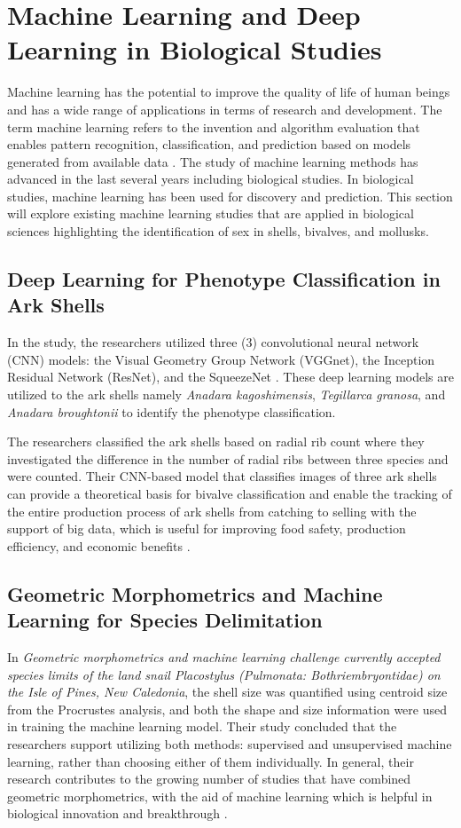 \section{Machine Learning and Deep Learning in Biological Studies}
Machine learning has the potential to improve the quality of life of human beings and has a wide range of applications in terms of research and development. The term machine learning refers to the invention and algorithm evaluation that enables pattern recognition, classification, and prediction based on models generated from available data \cite{tarca2007}. The study of machine learning methods has advanced in the last several years including biological studies. In biological studies, machine learning has been used for discovery and prediction. This section will explore existing machine learning studies that are applied in biological sciences highlighting the identification of sex in shells, bivalves, and mollusks.

\subsection{Deep Learning for Phenotype Classification in Ark Shells}
In the study, the researchers utilized three (3) convolutional neural network (CNN) models: the Visual Geometry Group Network (VGGnet), the Inception Residual Network (ResNet), and the SqueezeNet \cite{kim2024}. These deep learning models are utilized to the ark shells namely \textit{Anadara kagoshimensis}, \textit{Tegillarca granosa}, and \textit{Anadara broughtonii} to identify the phenotype classification. 

The researchers classified the ark shells based on radial rib count where they investigated the difference in the number of radial ribs between three species and were counted. Their CNN-based model that classifies images of three ark shells can provide a theoretical basis for bivalve classification and enable the tracking of the entire production process of ark shells from catching to selling with the support of big data, which is useful for improving food safety, production efficiency, and economic benefits \cite{kim2024}.

\subsection{Geometric Morphometrics and Machine Learning for Species Delimitation}
In \textit{Geometric morphometrics and machine learning challenge currently accepted species limits of the land snail Placostylus (Pulmonata: Bothriembryontidae) on the Isle of Pines, New Caledonia}, the shell size was quantified using centroid size from the Procrustes analysis, and both the shape and size information were used in training the machine learning model. Their study concluded that the researchers support utilizing both methods: supervised and unsupervised machine learning, rather than choosing either of them individually. In general, their research contributes to the growing number of studies that have combined geometric morphometrics, with the aid of machine learning which is helpful in biological innovation and breakthrough \cite{quenu2020}.

